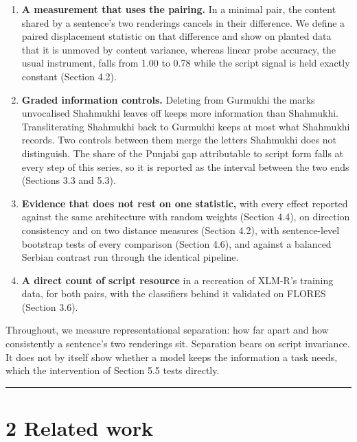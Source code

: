 \begin{enumerate}
\def\labelenumi{\arabic{enumi}.}
\tightlist
\item
  \textbf{A measurement that uses the pairing.} In a minimal pair, the
  content shared by a sentence's two renderings cancels in their
  difference. We define a paired displacement statistic on that
  difference and show on planted data that it is unmoved by content
  variance, whereas linear probe accuracy, the usual instrument, falls
  from 1.00 to 0.78 while the script signal is held exactly constant
  (Section 4.2).
\item
  \textbf{Graded information controls.} Deleting from Gurmukhi the marks
  unvocalised Shahmukhi leaves off keeps more information than
  Shahmukhi. Transliterating Shahmukhi back to Gurmukhi keeps at most
  what Shahmukhi records. Two controls between them merge the letters
  Shahmukhi does not distinguish. The share of the Punjabi gap
  attributable to script form falls at every step of this series, so it
  is reported as the interval between the two ends (Sections 3.3 and
  5.3).
\item
  \textbf{Evidence that does not rest on one statistic,} with every
  effect reported against the same architecture with random weights
  (Section 4.4), on direction consistency and on two distance measures
  (Section 4.2), with sentence-level bootstrap tests of every comparison
  (Section 4.6), and against a balanced Serbian contrast run through the
  identical pipeline.
\item
  \textbf{A direct count of script resource} in a recreation of XLM-R's
  training data, for both pairs, with the classifiers behind it
  validated on FLORES (Section 3.6).
\end{enumerate}

Throughout, we measure representational separation: how far apart and
how consistently a sentence's two renderings sit. Separation bears on
script invariance. It does not by itself show whether a model keeps the
information a task needs, which the intervention of Section 5.5 tests
directly.

\begin{center}\rule{0.5\linewidth}{0.5pt}\end{center}

\hypertarget{related-work}{%
\section{2 Related work}\label{related-work}}


